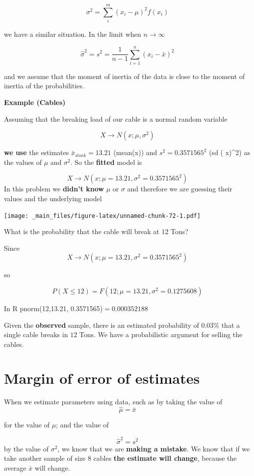 \documentclass[
]{book}
\begin{document}
\[\sigma^2=\sum_{i}^m(x_i-\mu)^2f(x_i)\]

we have a similar situation. In the limit when \(n \rightarrow \infty\)

\[\hat{\sigma}^2=s^2=\frac{1}{n-1}\sum_{i=1}^n(x_i-\bar{x})^2\]

and we assume that the moment of inertia of the data is close to the moment of inertia of the probabilities.

\textbf{Example (Cables)}

Assuming that the breaking load of our cable is a normal random variable

\[X \rightarrow N(x; \mu, \sigma^2)\]

\textbf{we use} the estimates \(\bar{x}_{stock}=13.21\) (mean(x)) and \(s^2=0.3571565^2\) (sd ( x)\^{}2) as the values of \(\mu\) and \(\sigma^2\). So the \textbf{fitted} model is

\[X \rightarrow N(x; \mu=13.21, \sigma^2=0.3571565^2)\]
In this problem we \textbf{didn't know} \(\mu\) or \(\sigma\) and therefore we are guessing their values and the underlying model

\texttt{[image: \_main\_files/figure-latex/unnamed-chunk-72-1.pdf]}

What is the probability that the cable will break at \(12\) Tons?

Since \[X \rightarrow N(x; \mu=13.21, \sigma^2=0.3571565^2)\]

so

\[P(X \leq 12)= F(12; \mu=13.21, \sigma^2=0.1275608)\]

In R pnorm(12,13.21, 0.3571565)\(=0.000352188\)

Given the \textbf{observed} sample, there is an estimated probability of \(0.03\%\) that a single cable breaks in \(12\) Tons. We have a probabilistic argument for selling the cables.

\hypertarget{margin-of-error-of-estimates}{%
\section{Margin of error of estimates}\label{margin-of-error-of-estimates}}

When we estimate parameters using data, such as by taking the value of \[\hat{\mu}=\bar{x}\]

for the value of \(\mu\); and the value of

\[\hat{\sigma}^2=s^2\]
by the value of \(\sigma^2\), we know that we are \textbf{making a mistake}. We know that if we take another sample of size \(8\) cables \textbf{the estimate will change}, because the average \(\bar{x}\) will change.
\end{document}
